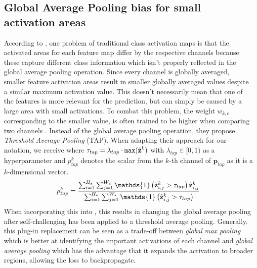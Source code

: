 \subsection{Global Average Pooling bias for small activation areas}
According to \citet{Bae2020RethinkingCAM}, one problem of traditional class activation maps is that the activated areas for each feature map differ by the respective channels because these capture different class information which isn't properly reflected in the global average pooling operation. Since every channel is globally averaged, smaller feature activation areas result in smaller globally averaged values despite a similar maximum activation value. This doesn't necessarily mean that one of the features is more relevant for the prediction, but can simply be caused by a large area with small activations. To combat this problem, the weight $w_{k,c}$ corresponding to the smaller value, is often trained to be higher when comparing two channels \citep{Bae2020RethinkingCAM}. Instead of the global average pooling operation, they propose \emph{Threshold Average Pooling} (TAP). When adapting their approach for our notation, we receive  where $\tau_{t a p} = \lambda_{tap} \cdot \mathtt{max}(\Tilde{\mathbf{z}}^k)$ with $\lambda_{tap} \in [0,1)$ as a hyperparameter and $p^k_{tap}$ denotes the scalar from the $k$-th channel of $\mathbf{p}_{tap}$ as it is a $k$-dimensional vector. 
\begin{equation}
\label{eq:tap}
p^k_{tap} =\frac{\sum_{i=1}^{H_\mathbf{z}} \sum_{j=1}^{W_\mathbf{z}} \mathds{1}\left(\Tilde{\mathbf{z}}^k_{i,j} > \tau_{t a p}\right) \Tilde{\mathbf{z}}^k_{i,j}}{\sum_{i=1}^{H_\mathbf{z}} \sum_{j=1}^{W_\mathbf{z}} \mathds{1}\left(\Tilde{\mathbf{z}}^k_{i,j} > \tau_{t a p}\right)}
\end{equation}
When incorporating this into \divcam, this results in changing the global average pooling after self-challenging has been applied to a threshold average pooling. Generally, this plug-in replacement can be seen as a trade-off between \emph{global max pooling} which is better at identifying the important activations of each channel and \emph{global average pooling} which has the advantage that it expands the activation to broader regions, allowing the loss to backpropagate.

